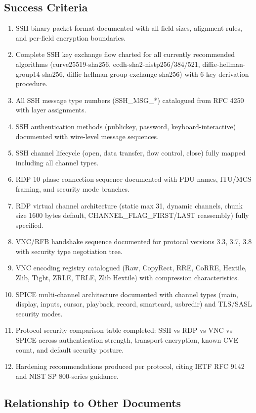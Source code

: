 \documentclass[11pt,letterpaper]{article}
\begin{document}
\subsection{Success Criteria}

\begin{enumerate}[leftmargin=*, label=\textbf{SC-\arabic*.}]
\item SSH binary packet format documented with all field sizes, alignment rules, and per-field encryption boundaries.
\item Complete SSH key exchange flow charted for all currently recommended algorithms (curve25519-sha256, ecdh-sha2-nistp256/384/521, diffie-hellman-group14-sha256, diffie-hellman-group-exchange-sha256) with 6-key derivation procedure.
\item All SSH message type numbers (SSH\_MSG\_*) catalogued from RFC 4250 with layer assignments.
\item SSH authentication methods (publickey, password, keyboard-interactive) documented with wire-level message sequences.
\item SSH channel lifecycle (open, data transfer, flow control, close) fully mapped including all channel types.
\item RDP 10-phase connection sequence documented with PDU names, ITU/MCS framing, and security mode branches.
\item RDP virtual channel architecture (static max 31, dynamic channels, chunk size 1600 bytes default, CHANNEL\_FLAG\_FIRST/LAST reassembly) fully specified.
\item VNC/RFB handshake sequence documented for protocol versions 3.3, 3.7, 3.8 with security type negotiation tree.
\item VNC encoding registry catalogued (Raw, CopyRect, RRE, CoRRE, Hextile, Zlib, Tight, ZRLE, TRLE, Zlib Hextile) with compression characteristics.
\item SPICE multi-channel architecture documented with channel types (main, display, inputs, cursor, playback, record, smartcard, usbredir) and TLS/SASL security modes.
\item Protocol security comparison table completed: SSH vs RDP vs VNC vs SPICE across authentication strength, transport encryption, known CVE count, and default security posture.
\item Hardening recommendations produced per protocol, citing IETF RFC 9142 and NIST SP 800-series guidance.
\end{enumerate}

\subsection{Relationship to Other Documents}
\end{document}
